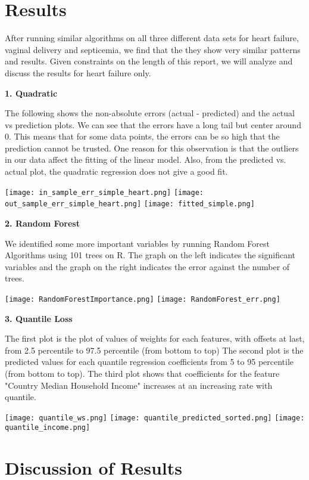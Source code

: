 \documentclass[letterpaper,11pt]{article}
\begin{document}
\section*{Results}
After running similar algorithms on all three different data sets for heart failure, vaginal delivery and septicemia, we find that the they show very similar patterns and results. Given constraints on the length of this report, we will analyze and discuss the results for heart failure only. 


\textbf{\large{1. Quadratic}}

The following shows the non-absolute errors (actual - predicted) and the actual vs prediction plots. We can see that the errors have a long tail but center around 0. This means that for some data points, the errors can be so high that the prediction cannot be trusted. One reason for this observation is that the outliers in our data affect the fitting of the linear model. Also, from the predicted vs. actual plot, the quadratic regression does not give a good fit. 

\texttt{[image: in\_sample\_err\_simple\_heart.png]}
\texttt{[image: out\_sample\_err\_simple\_heart.png]}
\texttt{[image: fitted\_simple.png]}


\textbf{\large{2. Random Forest}}

We identified some more important variables by running Random Forest Algorithms using 101 trees on R. The graph on the left indicates the significant variables and the graph on the right indicates the error against the number of trees. 



\texttt{[image: RandomForestImportance.png]}
\texttt{[image: RandomForest\_err.png]}

\textbf{\large{3. Quantile Loss}}

The first plot is the plot of values of weights for each features, with offsets at last, from 2.5 percentile to 97.5 percentile (from bottom to top)
The second plot is the predicted values for each quantile regression coefficients from 5 to 95 percentile (from bottom to top). The third plot shows that coefficients for the feature "Country Median Household Income" increases at an increasing rate with quantile.


\texttt{[image: quantile\_ws.png]}
\texttt{[image: quantile\_predicted\_sorted.png]}
\texttt{[image: quantile\_income.png]}


\section*{Discussion of Results}
\end{document}
